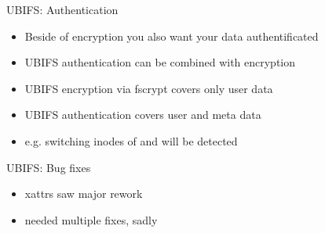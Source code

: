 \documentclass[aspectratio=169,obeyspaces,spaces,hyphens,dvipsnames]{beamer}
\begin{document}
\begin{frame}{UBIFS: Authentication}
  \begin{itemize}
   \item Beside of encryption you also want your data authentificated
   \item UBIFS authentication can be combined with encryption
   \item UBIFS encryption via fscrypt covers only user data
   \item UBIFS authentication covers user and meta data
   \item e.g. switching inodes of  and  will be detected
  \end{itemize}
\end{frame}

\begin{frame}{UBIFS: Bug fixes}
  \begin{itemize}
   \item xattrs saw major rework
   \item {} needed multiple fixes, sadly
  \end{itemize}
\end{frame}
\end{document}
